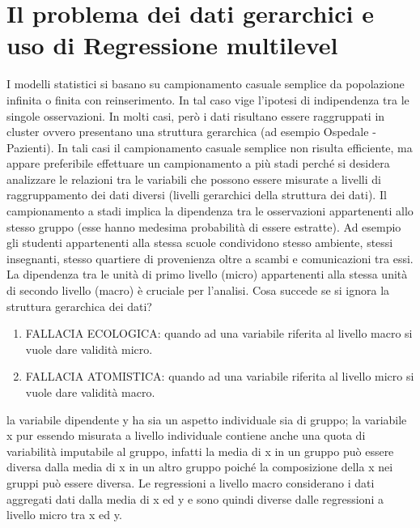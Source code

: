 \documentclass[a4page, 11pt]{article} %
\begin{document}
\section{Il problema dei dati gerarchici e uso di Regressione multilevel}

I modelli statistici si basano su campionamento casuale semplice da popolazione infinita o finita con reinserimento. In tal caso vige l’ipotesi di indipendenza tra le singole osservazioni.
\newline 
In molti casi, però i dati risultano essere raggruppati in cluster ovvero presentano una struttura gerarchica (ad esempio Ospedale - Pazienti). In tali casi il campionamento casuale semplice non risulta efficiente, ma appare preferibile effettuare un campionamento a più stadi perché si desidera analizzare le relazioni tra le variabili che possono essere misurate a livelli di raggruppamento dei dati diversi (livelli gerarchici della struttura dei dati).
\newline
Il campionamento a stadi implica la dipendenza tra le osservazioni appartenenti allo stesso gruppo (esse hanno medesima probabilità di essere estratte).
\newline
Ad esempio gli studenti appartenenti alla stessa scuole condividono stesso ambiente, stessi insegnanti, stesso quartiere di provenienza oltre a scambi e comunicazioni tra essi.
\newline
La dipendenza tra le unità di primo livello (micro) appartenenti alla stessa unità di secondo livello (macro) è cruciale per l’analisi.
\newline
Cosa succede se si ignora la struttura gerarchica dei dati?
\begin{enumerate}[noitemsep]
\item FALLACIA ECOLOGICA: quando ad una variabile riferita al livello macro si vuole dare validità micro.
\item FALLACIA ATOMISTICA: quando ad una variabile riferita al livello micro si vuole dare validità macro.
\end{enumerate}
la variabile dipendente y ha sia un aspetto individuale sia di gruppo; la variabile x pur essendo misurata a livello individuale contiene anche una quota di variabilità imputabile al gruppo, infatti la media di x in un gruppo può essere diversa dalla media di x in un altro gruppo poiché la composizione della x nei gruppi può essere diversa.
\newline
Le regressioni a livello macro considerano i dati aggregati dati dalla media di x ed y e sono quindi diverse dalle regressioni a livello micro tra x ed y.
\end{document}
